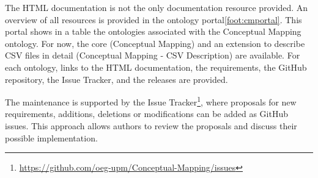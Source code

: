 The HTML documentation is not the only documentation resource provided. An overview of all resources is provided in the ontology portal\cref{foot:cmportal}. This portal shows in a table the ontologies associated with the Conceptual Mapping ontology. For now, the core (Conceptual Mapping) and an extension to describe CSV files in detail (Conceptual Mapping - CSV Description) are available. For each ontology, links to the HTML documentation, the requirements, the GitHub repository, the Issue Tracker, and the releases are provided. 

The maintenance is supported by the Issue Tracker\footnote{\url{https://github.com/oeg-upm/Conceptual-Mapping/issues}}, where proposals for new requirements, additions, deletions or modifications can be added as GitHub issues. This approach allows authors to review the proposals and discuss their possible implementation.

